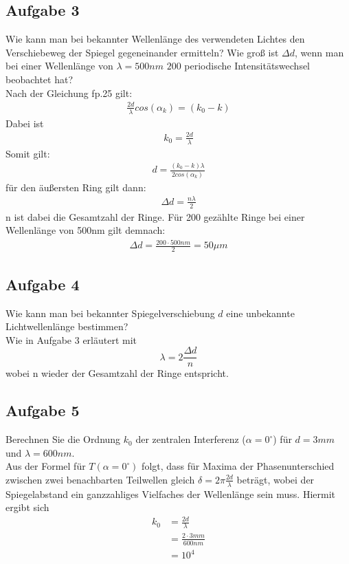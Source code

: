 \documentclass[a4paper,10pt]{scrartcl}
\begin{document}
	\subsection{Aufgabe 3} 
	Wie kann man bei bekannter Wellenlänge des verwendeten Lichtes den Verschiebeweg der Spiegel gegeneinander ermitteln? Wie groß ist $\Delta d$, wenn man bei einer Wellenlänge von $\lambda = 500nm$ $200$ periodische Intensitätswechsel beobachtet hat?\\
	Nach der Gleichung fp.25 gilt:
	\begin{align*}
	\frac{2d}{\lambda}cos(\alpha_{k})=(k_{0}-k)
	\end{align*}
	Dabei ist
	\begin{align*}
	k_{0}=\frac{2d}{\lambda}
	\end{align*}
	Somit gilt:
	\begin{align*}
	d=\frac{(k_{0}-k)\lambda}{2cos(\alpha_{k})}
	\end{align*}
	für den äußersten Ring gilt dann:
	\begin{align*}
	\Delta d=\frac{n\lambda}{2}
	\end{align*}
	n ist dabei die Gesamtzahl der Ringe. Für 200 gezählte Ringe bei einer Wellenlänge von 500nm gilt demnach:
	\begin{align*}
	\Delta d=\frac{200\cdot 500nm}{2}=50\mu m
	\end{align*}
	\subsection{Aufgabe 4}
	 Wie kann man bei bekannter Spiegelverschiebung $d$ eine unbekannte Lichtwellenlänge bestimmen?\\
	Wie in Aufgabe 3 erläutert mit
	\[
	{\lambda}=2\frac{\Delta d}{n}
	\]
	wobei n wieder der Gesamtzahl der Ringe entspricht. \\
	\subsection{Aufgabe 5} 
	Berechnen Sie die Ordnung $k_0$ der zentralen Interferenz ($\alpha=0^\circ$) für $d=3mm$ und $\lambda =600nm$.
	\\Aus der Formel für $T(\alpha=0^\circ)$ folgt, dass für Maxima der Phasenunterschied zwischen zwei benachbarten Teilwellen gleich $\delta=2\pi \frac{2d}{\lambda}$ beträgt, wobei der Spiegelabstand ein ganzzahliges Vielfaches der Wellenlänge sein muss. Hiermit ergibt sich
	\begin{align*}
	k_0 &= \frac{2d}{\lambda}
	\\ &= \frac{2\cdot 3mm}{600nm}
	\\ &= 10^4
	\end{align*}\\
\end{document}

